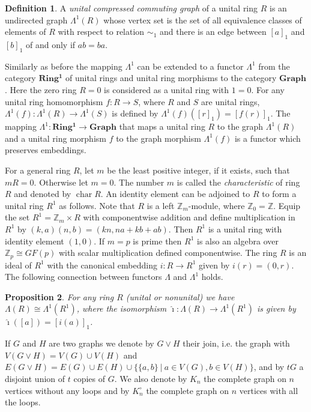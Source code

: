 \documentclass[12pt,a4paper]{amsart}
\newtheorem{proposition}{Proposition}
\theoremstyle{definition}
\newtheorem{definition}[proposition]{Definition}
\newcommand{\Z}{\mathbb{Z}}
\DeclareMathOperator{\ch}{char}
\begin{document}
\begin{definition}\label{def:UCCG}
    A \emph{unital compressed commuting graph} of a unital ring $R$ is an undirected graph $\Lambda^1(R)$ whose vertex set is the set of all equivalence classes of elements of $R$ with respect to relation $\sim_1$ and there is an edge between $[a]_1$ and $[b]_1$ of and only if $ab=ba$.
\end{definition}

Similarly as before the mapping $\Lambda^1$ can be extended to a functor $\Lambda^1$ from the category $\mathbf{Ring^1}$ of unital rings and unital ring morphisms to the category $\mathbf{Graph}$.
Here the zero ring $R=0$ is considered as a unital ring with $1=0$.
For any unital ring homomorphism $f \colon R \to S$, where $R$ and $S$ are unital rings, $\Lambda^1(f) \colon \Lambda^1(R) \to \Lambda^1(S)$ is defined by $\Lambda^1(f)([r]_1)=[f(r)]_1$.
The mapping $\Lambda^1 \colon \mathbf{Ring^1} \to \mathbf{Graph}$ that maps a unital ring $R$ to the graph $\Lambda^1(R)$ and a unital ring morphism $f$ to the graph morphism $\Lambda^1(f)$ is a functor which preserves embeddings.

For a general ring $R$, let $m$ be the least positive integer, if it exists, such that $mR=0$. Otherwise let $m=0$. The number $m$ is called the \emph{characteristic} of ring $R$ and denoted by $\ch R$. An identity element can be adjoined to $R$ to form a unital ring $R^1$ as follows.
Note that $R$ is a left $\Z_m$-module, where $\Z_0=\Z$.
Equip the set $R^1=\Z_m \times R$ with componentwise addition and define multiplication in $R^1$ by $(k,a)(n,b)=(kn,na+kb+ab)$.
Then $R^1$ is a unital ring with identity element $(1,0)$.
If $m=p$ is prime then $R^1$ is also an algebra over $\Z_p \cong GF(p)$ with scalar multiplication defined componentwise.
The ring $R$ is an ideal of $R^1$ with the canonical embedding $i \colon R \to R^1$ given by $i(r)=(0,r)$.
The following connection between functors $\Lambda$ and $\Lambda^1$ holds.

\begin{proposition}\label{prop:iso}
    For any ring $R$ (unital or nonunital) we have $\Lambda(R) \cong \Lambda^1(R^1)$, where the isomorphism $\hat{\imath} \colon \Lambda(R) \to \Lambda^1(R^1)$ is given by $\hat{\imath}([a])=[i(a)]_1$.
\end{proposition}

If $G$ and $H$ are two graphs we denote by $G \vee H$ their join, i.e. the graph with  $V(G \vee H) = V(G) \cup V(H)$ and $E(G \vee H) = E(G) \cup E(H) \cup \{\{a,b\} ~|~ a \in V(G), b \in V(H)\}$, and by $tG$ a disjoint union of $t$ copies of $G$. We also denote by $K_n$ the complete graph on $n$ vertices without any loops and by $K^\circ_n$ the complete graph on $n$ vertices with all the loops.
\end{document}
